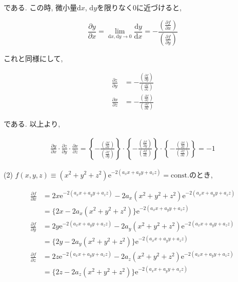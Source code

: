 \documentclass[dvipdfmx]{jsarticle}
\begin{document}
である. この時, 微小量$\mathrm{d}x$, $\mathrm{d}y$を限りなく0に近づけると, 

\begin{equation*}
    \frac{\partial y}{\partial x} = \lim_{\mathrm{d}x, \mathrm{d}y \to 0} \frac{\mathrm{d} y}{\mathrm{d} x} = - \frac{\left(\frac{\partial f}{\partial x}\right)}{\left(\frac{\partial f}{\partial y}\right)}
\end{equation*}

これと同様にして, 

\begin{align*}
    \frac{\partial z}{\partial y} &= - \frac{\left(\frac{\partial f}{\partial y}\right)}{\left(\frac{\partial f}{\partial z}\right)} \\
    \frac{\partial x}{\partial z} &= - \frac{\left(\frac{\partial f}{\partial z}\right)}{\left(\frac{\partial f}{\partial x}\right)}
\end{align*}

である. 以上より, 

\begin{align*}
    \frac{\partial y}{\partial x} \cdot \frac{\partial z}{\partial y} \cdot \frac{\partial x}{\partial z} = \left\{- \frac{\left(\frac{\partial f}{\partial x}\right)}{\left(\frac{\partial f}{\partial y}\right)}\right\} \cdot \left\{-\frac{\left(\frac{\partial f}{\partial y}\right)}{\left(\frac{\partial f}{\partial z}\right)}\right\} \cdot \left\{-\frac{\left(\frac{\partial f}{\partial z}\right)}{\left(\frac{\partial f}{\partial x}\right)}\right\} = -1
\end{align*}


(2) $f(x, y, z) \equiv (x^2 + y^2 + z^2) \mathrm{e}^{-2(a_x x + a_y y + a_z z)} = \mathrm{const.}$のとき, 

\begin{align*}
    \frac{\partial f}{\partial x} &= 2x\mathrm{e}^{-2(a_x x + a_y y + a_z z)} -2a_x(x^2 + y^2 + z^2)\mathrm{e}^{-2(a_x x + a_y y + a_z z)} \\
    &= \{2x - 2a_x(x^2 + y^2 + z^2)\}\mathrm{e}^{-2(a_x x + a_y y + a_z z)} \\
    \frac{\partial f}{\partial y} &= 2y\mathrm{e}^{-2(a_x x + a_y y + a_z z)} -2a_y(x^2 + y^2 + z^2)\mathrm{e}^{-2(a_x x + a_y y + a_z z)} \\
    &= \{2y - 2a_y(x^2 + y^2 + z^2)\}\mathrm{e}^{-2(a_x x + a_y y + a_z z)} \\
    \frac{\partial f}{\partial z} &= 2z\mathrm{e}^{-2(a_x x + a_y y + a_z z)} -2a_z(x^2 + y^2 + z^2)\mathrm{e}^{-2(a_x x + a_y y + a_z z)} \\
    &= \{2z - 2a_z(x^2 + y^2 + z^2)\}\mathrm{e}^{-2(a_x x + a_y y + a_z z)} 
\end{align*}
\end{document}
